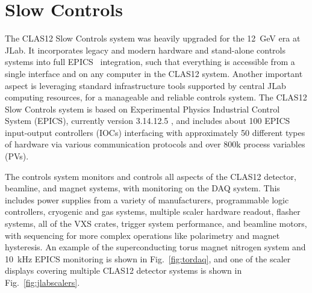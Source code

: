 \section{Slow Controls}

The CLAS12 Slow Controls system was heavily upgraded for the 12~GeV era at JLab.  It incorporates legacy and modern
hardware and stand-alone controls systems into full EPICS~\cite{epics-website} integration, such that everything is
accessible from a single interface and on any computer in the CLAS12 system.  Another important aspect is leveraging
standard infrastructure tools supported by central JLab computing resources, for a manageable and reliable controls
system. The CLAS12 Slow Controls system is based on Experimental Physics Industrial Control System (EPICS), currently
version 3.14.12.5 , and includes about 100 EPICS input-output controllers (IOCs) interfacing with approximately 50
different types of hardware via various communication protocols and over 800k process variables (PVs).

The controls system monitors and controls all aspects of the CLAS12 detector, beamline, and magnet systems, with
monitoring on the DAQ system.  This includes power supplies from a variety of manufacturers, programmable logic
controllers, cryogenic and gas systems, multiple scaler hardware readout, flasher systems, all of the VXS crates, trigger
system performance, and beamline motors, with sequencing for more complex operations like polarimetry and magnet
hysteresis. An example of the superconducting torus magnet nitrogen system and 10~kHz EPICS monitoring is shown in
Fig.~\ref{fig:tordaq}, and one of the scaler displays covering multiple CLAS12 detector systems is shown in
Fig.~\ref{fig:jlabscalers}.

